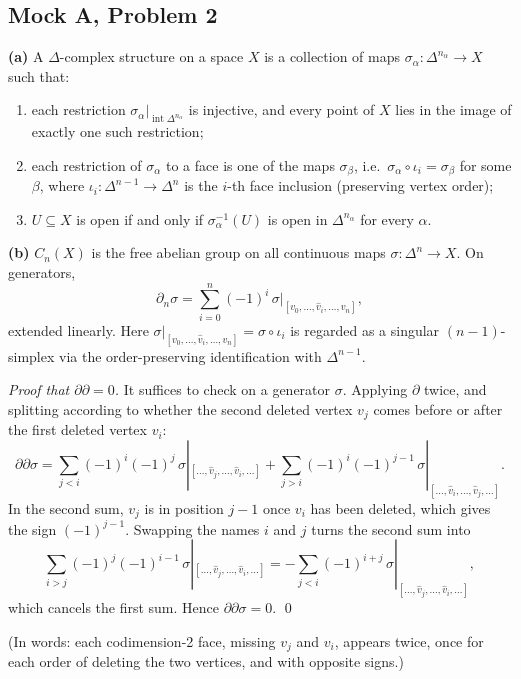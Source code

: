 \documentclass[11pt]{article}
\begin{document}
\subsection*{Mock A, Problem 2}

\textbf{(a)} A $\Delta$-complex structure on a space $X$ is a collection of maps $\sigma_\alpha:\Delta^{n_\alpha}\to X$ such that:
\begin{enumerate}[label=(\roman*)]
\item each restriction $\sigma_\alpha|_{\operatorname{int}\Delta^{n_\alpha}}$ is injective, and every point of $X$ lies in the image of exactly one such restriction;
\item each restriction of $\sigma_\alpha$ to a face is one of the maps $\sigma_\beta$, i.e.\ $\sigma_\alpha\circ\iota_i=\sigma_\beta$ for some $\beta$, where $\iota_i:\Delta^{n-1}\to\Delta^n$ is the $i$-th face inclusion (preserving vertex order);
\item $U\subseteq X$ is open if and only if $\sigma_\alpha^{-1}(U)$ is open in $\Delta^{n_\alpha}$ for every $\alpha$.
\end{enumerate}

\textbf{(b)} $C_n(X)$ is the free abelian group on all continuous maps $\sigma:\Delta^n\to X$. On generators,
\[\partial_n\sigma=\sum_{i=0}^n(-1)^i\,\sigma|_{[v_0,\dots,\hat v_i,\dots,v_n]},\]
extended linearly. Here $\sigma|_{[v_0,\dots,\hat v_i,\dots,v_n]}=\sigma\circ\iota_i$ is regarded as a singular $(n-1)$-simplex via the order-preserving identification with $\Delta^{n-1}$.

\emph{Proof that $\partial\partial=0$.} It suffices to check on a generator $\sigma$. Applying $\partial$ twice, and splitting according to whether the second deleted vertex $v_j$ comes before or after the first deleted vertex $v_i$:
\[\partial\partial\sigma=\sum_{j<i}(-1)^i(-1)^j\,\sigma|_{[\dots,\hat v_j,\dots,\hat v_i,\dots]}+\sum_{j>i}(-1)^i(-1)^{j-1}\,\sigma|_{[\dots,\hat v_i,\dots,\hat v_j,\dots]}.\]
In the second sum, $v_j$ is in position $j-1$ once $v_i$ has been deleted, which gives the sign $(-1)^{j-1}$. Swapping the names $i$ and $j$ turns the second sum into
\[\sum_{i>j}(-1)^j(-1)^{i-1}\,\sigma|_{[\dots,\hat v_j,\dots,\hat v_i,\dots]}=-\sum_{j<i}(-1)^{i+j}\,\sigma|_{[\dots,\hat v_j,\dots,\hat v_i,\dots]},\]
which cancels the first sum. Hence $\partial\partial\sigma=0$. \qed

(In words: each codimension-2 face, missing $v_j$ and $v_i$, appears twice, once for each order of deleting the two vertices, and with opposite signs.)
\end{document}
